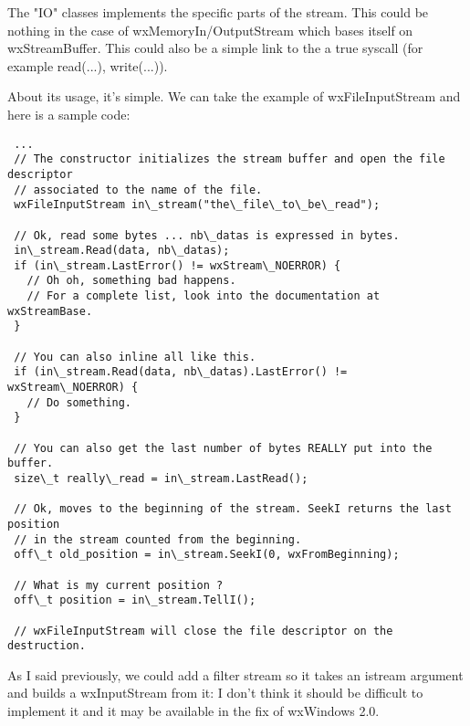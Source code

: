 The "IO" classes implements the specific parts of the stream. This could be
nothing in the case of wxMemoryIn/OutputStream which bases itself on
wxStreamBuffer. This could also be a simple link to the a true syscall
(for example read(...), write(...)).


About its usage, it's simple. We can take the example of wxFileInputStream and here is a sample
code:

\begin{verbatim}
 ...
 // The constructor initializes the stream buffer and open the file descriptor
 // associated to the name of the file.
 wxFileInputStream in\_stream("the\_file\_to\_be\_read");

 // Ok, read some bytes ... nb\_datas is expressed in bytes.
 in\_stream.Read(data, nb\_datas);
 if (in\_stream.LastError() != wxStream\_NOERROR) {
   // Oh oh, something bad happens.
   // For a complete list, look into the documentation at wxStreamBase.
 }

 // You can also inline all like this.
 if (in\_stream.Read(data, nb\_datas).LastError() != wxStream\_NOERROR) {
   // Do something.
 }

 // You can also get the last number of bytes REALLY put into the buffer.
 size\_t really\_read = in\_stream.LastRead();

 // Ok, moves to the beginning of the stream. SeekI returns the last position 
 // in the stream counted from the beginning.
 off\_t old_position = in\_stream.SeekI(0, wxFromBeginning);
 
 // What is my current position ?
 off\_t position = in\_stream.TellI();

 // wxFileInputStream will close the file descriptor on the destruction.
\end{verbatim}


As I said previously, we could add a filter stream so it takes an istream
argument and builds a wxInputStream from it: I don't think it should 
be difficult to implement it and it may be available in the fix of wxWindows 2.0.

